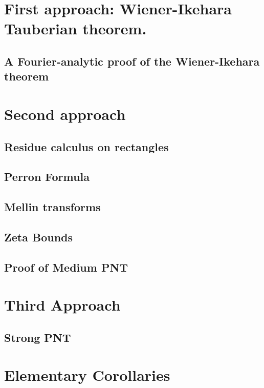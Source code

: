 \chapter{First approach: Wiener-Ikehara Tauberian theorem.}

\section{A Fourier-analytic proof of the Wiener-Ikehara theorem}



\chapter{Second approach}

\section{Residue calculus on rectangles}



\section{Perron Formula}


\section{Mellin transforms}



\section{Zeta Bounds}


\section{Proof of Medium PNT}



\chapter{Third Approach}

%

%

\section{Strong PNT}



\chapter{Elementary Corollaries}




